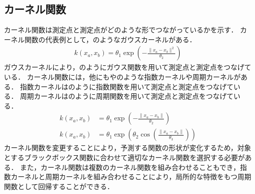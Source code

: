 \documentclass[twocolumn]{ltjarticle}
\begin{document}
\subsection{カーネル関数}

カーネル関数は測定点と測定点がどのような形でつながっているかを示す．
カーネル関数の代表例として，のようなガウスカーネルがある\cite{gaussian_process}．
\begin{align}
	k(x_a, x_b) = \theta_1 \exp \left( - \frac{\| x_a - x_b \|^2}{\theta_2} \right) \label{eq:gaussian_kernel}
\end{align}
ガウスカーネルにより，のようにガウス関数を用いて測定点と測定点をつなげている．
カーネル関数には，他にもやのような指数カーネルや周期カーネルがある．
指数カーネルはのように指数関数を用いて測定点と測定点をつなげている．
周期カーネルはのように周期関数を用いて測定点と測定点をつなげている．
\begin{align}
	k(x_a, x_b) & = \theta_1 \exp \left( - \frac{\| x_a - x_b \|}{\theta_2} \right) \label{eq:exp_kernel}                           \\
	k(x_a, x_b) & = \theta_1 \exp \left( \theta_2 \cos \left(\frac{\| x_a - x_b \|}{\theta_3} \right) \right) \label{eq:sin_kernel}
\end{align}
カーネル関数を変更することにより，予測する関数の形状が変化するため，対象とするブラックボックス関数に合わせて適切なカーネル関数を選択する必要がある．
また，カーネル関数は複数のカーネル関数を組み合わせることもでき，指数カーネルと周期カーネルを組み合わせることにより，局所的な特徴をもつ周期関数として回帰することができる．
\setlength\intextsep{6pt}
\setlength\textfloatsep{6pt}
\end{document}
